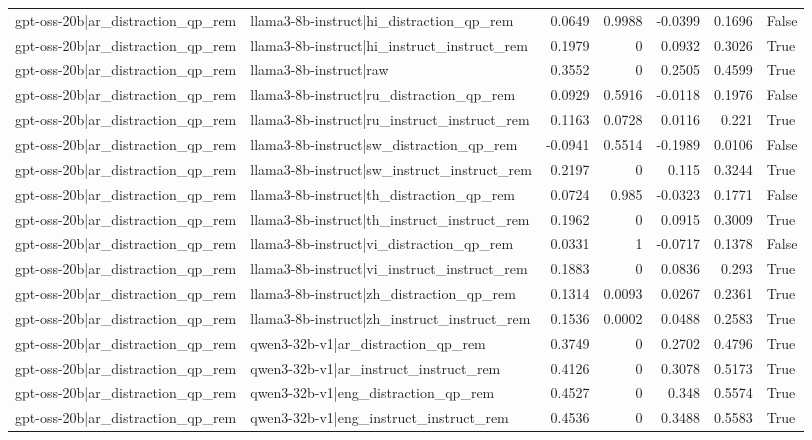 \begin{table}
\begin{tabular}{l l r r r r l}
gpt-oss-20b|ar_distraction_qp_rem & llama3-8b-instruct|hi_distraction_qp_rem & 0.0649 & 0.9988 & -0.0399 & 0.1696 & False \\
gpt-oss-20b|ar_distraction_qp_rem & llama3-8b-instruct|hi_instruct_instruct_rem & 0.1979 & 0 & 0.0932 & 0.3026 & True \\
gpt-oss-20b|ar_distraction_qp_rem & llama3-8b-instruct|raw & 0.3552 & 0 & 0.2505 & 0.4599 & True \\
gpt-oss-20b|ar_distraction_qp_rem & llama3-8b-instruct|ru_distraction_qp_rem & 0.0929 & 0.5916 & -0.0118 & 0.1976 & False \\
gpt-oss-20b|ar_distraction_qp_rem & llama3-8b-instruct|ru_instruct_instruct_rem & 0.1163 & 0.0728 & 0.0116 & 0.221 & True \\
gpt-oss-20b|ar_distraction_qp_rem & llama3-8b-instruct|sw_distraction_qp_rem & -0.0941 & 0.5514 & -0.1989 & 0.0106 & False \\
gpt-oss-20b|ar_distraction_qp_rem & llama3-8b-instruct|sw_instruct_instruct_rem & 0.2197 & 0 & 0.115 & 0.3244 & True \\
gpt-oss-20b|ar_distraction_qp_rem & llama3-8b-instruct|th_distraction_qp_rem & 0.0724 & 0.985 & -0.0323 & 0.1771 & False \\
gpt-oss-20b|ar_distraction_qp_rem & llama3-8b-instruct|th_instruct_instruct_rem & 0.1962 & 0 & 0.0915 & 0.3009 & True \\
gpt-oss-20b|ar_distraction_qp_rem & llama3-8b-instruct|vi_distraction_qp_rem & 0.0331 & 1 & -0.0717 & 0.1378 & False \\
gpt-oss-20b|ar_distraction_qp_rem & llama3-8b-instruct|vi_instruct_instruct_rem & 0.1883 & 0 & 0.0836 & 0.293 & True \\
gpt-oss-20b|ar_distraction_qp_rem & llama3-8b-instruct|zh_distraction_qp_rem & 0.1314 & 0.0093 & 0.0267 & 0.2361 & True \\
gpt-oss-20b|ar_distraction_qp_rem & llama3-8b-instruct|zh_instruct_instruct_rem & 0.1536 & 0.0002 & 0.0488 & 0.2583 & True \\
gpt-oss-20b|ar_distraction_qp_rem & qwen3-32b-v1|ar_distraction_qp_rem & 0.3749 & 0 & 0.2702 & 0.4796 & True \\
gpt-oss-20b|ar_distraction_qp_rem & qwen3-32b-v1|ar_instruct_instruct_rem & 0.4126 & 0 & 0.3078 & 0.5173 & True \\
gpt-oss-20b|ar_distraction_qp_rem & qwen3-32b-v1|eng_distraction_qp_rem & 0.4527 & 0 & 0.348 & 0.5574 & True \\
gpt-oss-20b|ar_distraction_qp_rem & qwen3-32b-v1|eng_instruct_instruct_rem & 0.4536 & 0 & 0.3488 & 0.5583 & True \\

\end{tabular}
\end{table}
